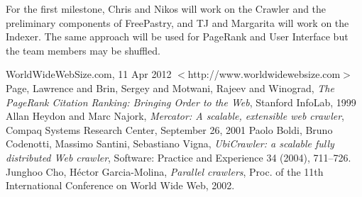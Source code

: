 \documentclass[11pt, letterpaper, oneside, twocolumn]{article}
\begin{document}
For the first milestone, Chris and Nikos will work on the Crawler and the preliminary components of FreePastry, and TJ and Margarita will work on the Indexer. The same approach will be used for PageRank and User Interface but the team members may be shuffled.

\begin{thebibliography}{9}

   WorldWideWebSize.com, 11 Apr 2012 $<$http://www.worldwidewebsize.com$>$
   Page, Lawrence and Brin, Sergey and Motwani, Rajeev and Winograd, \emph{The PageRank Citation Ranking: Bringing Order to the Web}, Stanford InfoLab, 1999
   Allan Heydon and Marc Najork, \emph{Mercator: A scalable, extensible web crawler}, Compaq Systems Research Center, September 26, 2001
   Paolo Boldi, Bruno Codenotti, Massimo Santini, Sebastiano Vigna, \emph{UbiCrawler: a scalable fully distributed Web crawler}, Software: Practice and Experience 34 (2004), 711–726.
   Junghoo Cho, Héctor Garcia-Molina, \emph{Parallel crawlers}, Proc. of the 11th International Conference on World Wide Web, 2002.

\end{thebibliography}
\end{document}
